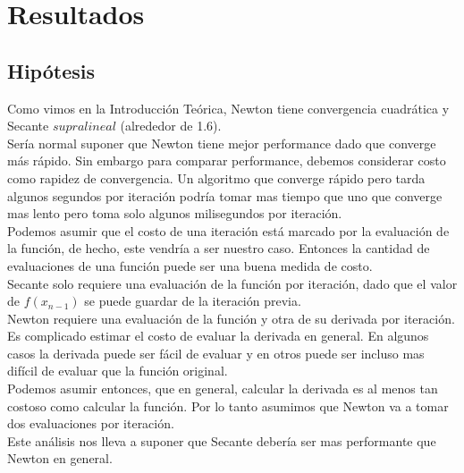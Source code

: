\section{Resultados}

\subsection{Hipótesis}
Como vimos en la Introducción Teórica, Newton tiene convergencia cuadrática y Secante $supralineal$ (alrededor de 1.6).\\

Sería normal suponer que Newton tiene mejor performance dado que converge más rápido. Sin embargo para comparar performance, debemos considerar costo como rapidez de convergencia. Un algoritmo que converge rápido pero tarda algunos segundos por iteración podría tomar mas tiempo que uno que converge mas lento pero toma solo algunos milisegundos por iteración.\\

Podemos asumir que el costo de una iteración está marcado por la evaluación de la función, de hecho, este vendría a ser nuestro caso. Entonces la cantidad de evaluaciones de una función puede ser una buena medida de costo.\\

Secante solo requiere una evaluación de la función por iteración, dado que el valor de $f(x_{n - 1})$ se puede guardar de la iteración previa.\\

Newton requiere una evaluación de la función y otra de su derivada por iteración. Es complicado estimar el costo de evaluar la derivada en general. En algunos casos la derivada puede ser fácil de evaluar y en otros puede ser incluso mas difícil de evaluar que la función original.\\

Podemos asumir entonces, que en general, calcular la derivada es al menos tan costoso como calcular la función. Por lo tanto asumimos que Newton va a tomar dos evaluaciones por iteración.\\

Este análisis nos lleva a suponer que Secante debería ser mas performante que Newton en general.

